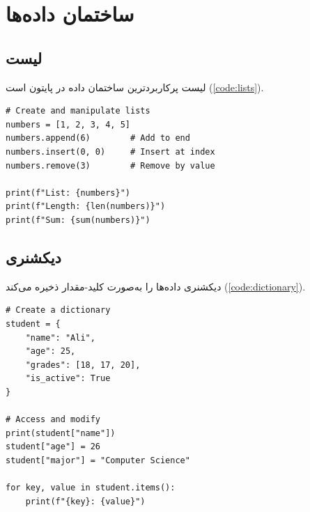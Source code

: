 \documentclass{matinbook}
\begin{document}
\chapter{ساختمان داده‌ها}
\label{chap:datastructures}

\section{لیست}
\label{sec:datastructures-list}

لیست پرکاربردترین ساختمان داده در
پایتون است (\cref{code:lists}).

\begin{latin}
\begin{verbatim}
# Create and manipulate lists
numbers = [1, 2, 3, 4, 5]
numbers.append(6)        # Add to end
numbers.insert(0, 0)     # Insert at index
numbers.remove(3)        # Remove by value

print(f"List: {numbers}")
print(f"Length: {len(numbers)}")
print(f"Sum: {sum(numbers)}")
\end{verbatim}
\end{latin}
\label{code:lists}

\section{دیکشنری}
\label{sec:datastructures-dict}

دیکشنری داده‌ها را به‌صورت
کلید-مقدار ذخیره می‌کند
(\cref{code:dictionary}).

\begin{latin}
\begin{verbatim}
# Create a dictionary
student = {
    "name": "Ali",
    "age": 25,
    "grades": [18, 17, 20],
    "is_active": True
}

# Access and modify
print(student["name"])
student["age"] = 26
student["major"] = "Computer Science"

for key, value in student.items():
    print(f"{key}: {value}")
\end{verbatim}
\end{latin}
\label{code:dictionary}

\end{document}
